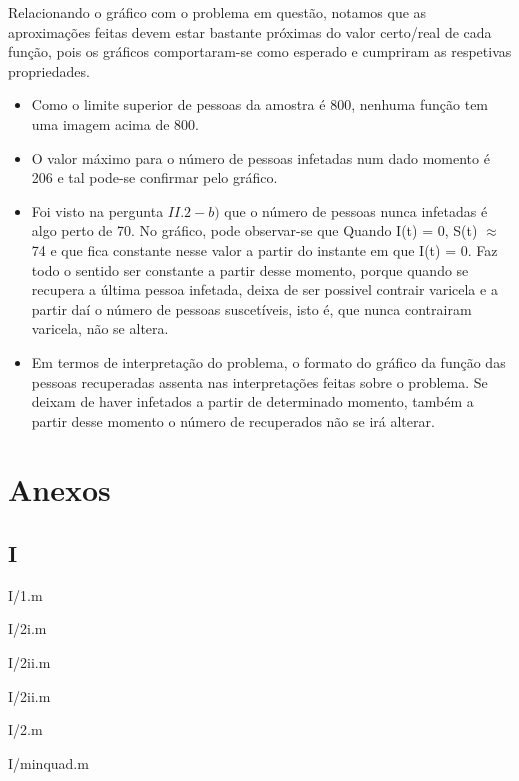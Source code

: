 \documentclass[portuguese, a4paper]{article}
\newcommand\tu[0]{\textunderscore}
\begin{document}

		Relacionando o gráfico com o problema em questão, notamos que as aproximações feitas devem estar
		bastante próximas do valor certo/real de cada função, pois os gráficos comportaram-se como esperado e cumpriram as respetivas propriedades.


		\begin{itemize}
		\item Como o limite superior de pessoas da amostra é 800, nenhuma função tem uma imagem acima de 800.
		\item O valor máximo para o número de pessoas infetadas num dado momento é 206 e tal pode-se confirmar pelo gráfico.
		\item Foi visto na pergunta $II.2-b)$ que o número de pessoas nunca infetadas é algo perto de 70. %
		No gráfico, pode observar-se que Quando I(t) = 0, S(t) $\approx$ 74 e que fica constante nesse valor a partir do instante em que I(t) = 0.
		Faz todo o sentido ser constante a partir desse momento, porque quando
		se recupera a última pessoa infetada, deixa de ser possivel contrair
		varicela e a partir daí o número de pessoas suscetíveis, isto é, que
		nunca contrairam varicela, não se altera.
		\item Em termos de interpretação do problema, o formato do gráfico da função das pessoas recuperadas assenta nas interpretações
		feitas sobre o problema. Se deixam de haver infetados a partir de determinado momento,
		também a partir desse momento o número de recuperados não se irá
		alterar.
		\end{itemize}

\section{Anexos}


\subsection{I}
	\par{I/1.m}
	
	\par{I/2\tu i.m}
	
	\par{I/2\tu ii.m}
	
	\par{I/2\tu ii.m}
	
	\par{I/2.m}
	
	\par{I/min\tu quad.m}
	
\end{document}
